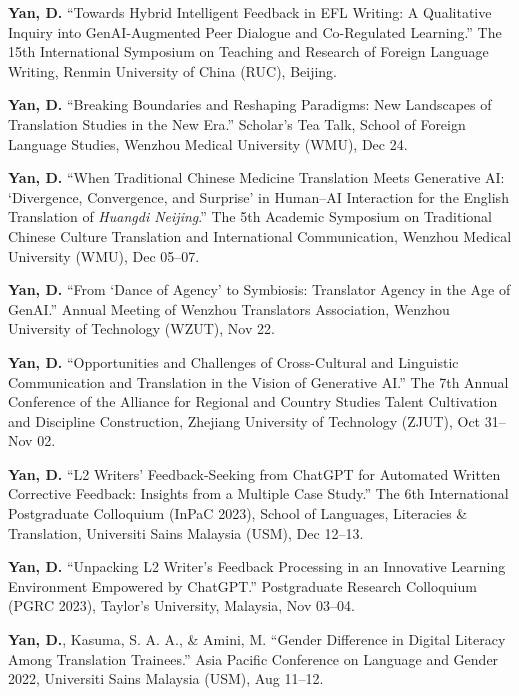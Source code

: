 \documentclass[11pt,a4paper]{article}
\begin{document}
\begin{tablist}
\item[2026] \textbf{Yan, D.} \enquote{Towards Hybrid Intelligent Feedback in EFL Writing: A Qualitative Inquiry into GenAI-Augmented Peer Dialogue and Co-Regulated Learning.} The 15th International Symposium on Teaching and Research of Foreign Language Writing, Renmin University of China (RUC), Beijing.

\item[2025] \textbf{Yan, D.} \enquote{Breaking Boundaries and Reshaping Paradigms: New Landscapes of Translation Studies in the New Era.} Scholar's Tea Talk, School of Foreign Language Studies, Wenzhou Medical University (WMU), Dec 24.

\item[2025] \textbf{Yan, D.} \enquote{When Traditional Chinese Medicine Translation Meets Generative AI: \enquote{Divergence, Convergence, and Surprise} in Human--AI Interaction for the English Translation of \textit{Huangdi Neijing}.} The 5th Academic Symposium on Traditional Chinese Culture Translation and International Communication, Wenzhou Medical University (WMU), Dec 05--07.

\item[2025] \textbf{Yan, D.} \enquote{From \enquote{Dance of Agency} to Symbiosis: Translator Agency in the Age of GenAI.} Annual Meeting of Wenzhou Translators Association, Wenzhou University of Technology (WZUT), Nov 22.

\item[2025] \textbf{Yan, D.} \enquote{Opportunities and Challenges of Cross-Cultural and Linguistic Communication and Translation in the Vision of Generative AI.} The 7th Annual Conference of the Alliance for Regional and Country Studies Talent Cultivation and Discipline Construction, Zhejiang University of Technology (ZJUT), Oct 31--Nov 02.

\item[2023] \textbf{Yan, D.} \enquote{L2 Writers' Feedback-Seeking from ChatGPT for Automated Written Corrective Feedback: Insights from a Multiple Case Study.} The 6th International Postgraduate Colloquium (InPaC 2023), School of Languages, Literacies \& Translation, Universiti Sains Malaysia (USM), Dec 12--13.

\item[2023] \textbf{Yan, D.} \enquote{Unpacking L2 Writer's Feedback Processing in an Innovative Learning Environment Empowered by ChatGPT.} Postgraduate Research Colloquium (PGRC 2023), Taylor's University, Malaysia, Nov 03--04.

\item[2022] \textbf{Yan, D.}, Kasuma, S. A. A., \& Amini, M. \enquote{Gender Difference in Digital Literacy Among Translation Trainees.} Asia Pacific Conference on Language and Gender 2022, Universiti Sains Malaysia (USM), Aug 11--12.
\end{tablist}
\end{document}
